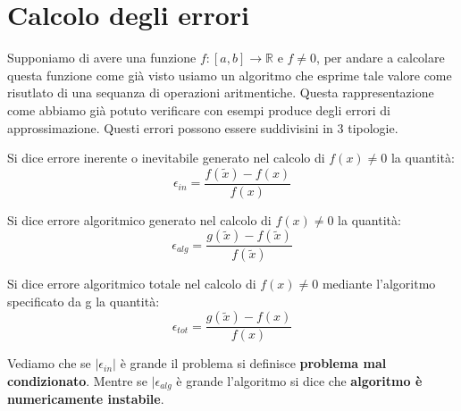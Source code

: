 \newpage
\section{Calcolo degli errori}
Supponiamo di avere una funzione \(f: [a,b] \to \mathbb{R}\) e \(f \neq 0\), per andare a calcolare questa funzione come già visto usiamo un algoritmo
che esprime tale valore come risutlato di una sequanza di operazioni aritmentiche. Questa rappresentazione come abbiamo già potuto
verificare con esempi produce degli errori di approssimazione. Questi errori possono essere suddivisini in 3 tipologie.

\begin{definition}
    Si dice errore inerente o inevitabile generato nel calcolo di \(f(x) \neq 0\) la quantità:
    \[\epsilon_{in} = \frac{f(\tilde{x}) - f(x)}{f(x)}\]
\end{definition}

\begin{definition}
    Si dice errore algoritmico generato nel calcolo di \(f(x) \neq 0\) la quantità:
    \[\epsilon_{alg} = \frac{g(\tilde{x}) - f(\tilde{x})}{f(\tilde{x})}\]
\end{definition}

\begin{definition}
    Si dice errore algoritmico totale nel calcolo di \(f(x) \neq 0\) mediante l'algoritmo specificato da g la quantità:
    \[\epsilon_{tot} = \frac{g(\tilde{x}) - f(x)}{f(x)}\]
\end{definition}

\begin{observation}
    Vediamo che se \(|\epsilon_{in}|\) è grande il problema si definisce \textbf{problema mal condizionato}. Mentre se
    \(|\epsilon_{alg}\) è grande l'algoritmo si dice che \textbf{algoritmo è numericamente instabile}.
\end{observation}